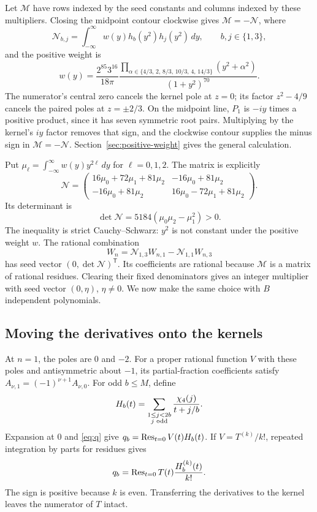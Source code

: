 Let $\mathcal M$ have rows indexed by the seed constants and
columns indexed by these multipliers. Closing the midpoint
contour clockwise gives $\mathcal M=-\mathcal N$, where
\[
 \mathcal N_{b,j}=\int_{-\infty}^{\infty}
              w(y)h_b(y^2)h_j(y^2)\,dy,\qquad b,j\in\{1,3\},
\]
and the positive weight is
\[
 w(y)=\frac{2^{85}3^{16}}{18\pi}
 \frac{\displaystyle
  \prod_{\alpha\in\{4/3,\,2,\,8/3,\,10/3,\,4,\,14/3\}}
                         (y^2+\alpha^2)}
      {(1+y^2)^{70}}.
\]
The numerator's central zero cancels the kernel pole at $z=0$;
its factor $z^2-4/9$ cancels the paired poles at $z=\pm2/3$.
On the midpoint line, $P_1$ is $-iy$ times a positive product,
since it has seven symmetric root pairs. Multiplying by the
kernel's $iy$ factor removes that sign, and the clockwise
contour supplies the minus sign in $\mathcal M=-\mathcal N$.
Section~\ref{sec:positive-weight} gives the general calculation.

Put $\mu_\ell=\int_{-\infty}^{\infty}w(y)y^{2\ell}\,dy$ for
$\ell=0,1,2$. The matrix is explicitly
\[
 \mathcal N=
 \begin{pmatrix}
 16\mu_0+72\mu_1+81\mu_2&-16\mu_0+81\mu_2\\
 -16\mu_0+81\mu_2&16\mu_0-72\mu_1+81\mu_2
 \end{pmatrix}.
\]
Its determinant is
\[
 \det\mathcal N=5184(\mu_0\mu_2-\mu_1^2)>0.
\]
The inequality is strict Cauchy--Schwarz: $y^2$ is not constant
under the positive weight $w$. The rational combination
\[
 W_n=\mathcal N_{1,3}W_{n,1}-\mathcal N_{1,1}W_{n,3}
\]
has seed vector $(0,\det\mathcal N)^{\mathsf T}$. Its coefficients
are rational because $\mathcal M$ is a matrix of rational residues.
Clearing their fixed denominators gives an integer multiplier
with seed vector $(0,\eta)$, $\eta\ne0$. We now make the same
choice with $B$ independent polynomials.

\subsection{Moving the derivatives onto the kernels}

At $n=1$, the poles are $0$ and $-2$. For a proper rational
function $V$ with these poles and antisymmetric about $-1$, its partial-fraction
coefficients satisfy $A_{\nu,1}=(-1)^{\nu+1}A_{\nu,0}$.
For odd $b\le M$, define
\[
 H_b(t)=\sum_{\substack{1\le j<2b\\j\text{ odd}}}
                           \frac{\chi_4(j)}{t+j/b}.
\]
Expansion at $0$ and \eqref{eq:q} give
$q_b=\operatorname{Res}_{t=0}V(t)H_b(t)$. If $V=T^{(k)}/k!$, repeated
integration by parts for residues gives
\begin{equation}\label{eq:residue}
 q_b=\operatorname{Res}_{t=0}T(t)\frac{H_b^{(k)}(t)}{k!}.
\end{equation}
The sign is positive because $k$ is even. Transferring the
derivatives to the kernel leaves the numerator of $T$ intact.


